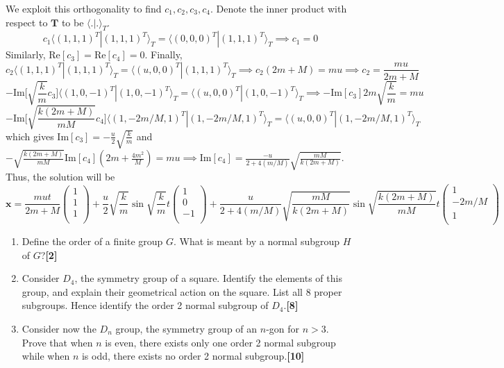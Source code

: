 \documentclass[a4paper]{article}
\begin{document}
\begin{ans}
\begin{enumerate}[label=(\roman*)]
We exploit this orthogonality to find $c_1,c_2,c_3,c_4$. Denote the inner product with respect to $\mathbf{T}$ to be $\langle.|.\rangle_T$.
$$c_1\langle (1,1,1)^T|(1,1,1)^T\rangle_T=\langle(0,0,0)^T|(1,1,1)^T\rangle_T\implies c_1=0$$
Similarly, $\text{Re}[c_3]=\text{Re}[c_4]=0$. Finally,
$$c_2\langle (1,1,1)^T|(1,1,1)^T\rangle_T=\langle(u,0,0)^T|(1,1,1)^T\rangle_T\implies c_2(2m+M)=mu\implies c_2=\frac{mu}{2m+M}$$
$$-\text{Im}\bigg[\sqrt{\frac{k}{m}}c_3\bigg]\langle (1,0,-1)^T|(1,0,-1)^T\rangle_T=\langle(u,0,0)^T|(1,0,-1)^T\rangle_T\implies -\text{Im}[c_3]2m\sqrt{\frac{k}{m}}=mu$$
$$-\text{Im}\bigg[\sqrt{\frac{k(2m+M)}{mM}}c_4\bigg]\langle (1,-2m/M,1)^T|(1,-2m/M,1)^T\rangle_T=\langle(u,0,0)^T|(1,-2m/M,1)^T\rangle_T$$
which gives $\text{Im}[c_3]=-\frac{u}{2}\sqrt{\frac{k}{m}}$ and $-\sqrt{\frac{k(2m+M)}{mM}}\text{Im}[c_4](2m+\frac{4m^2}{M})=mu\implies \text{Im}[c_4]=\frac{-u}{2+4(m/M)}\sqrt{\frac{mM}{k(2m+M)}}$. Thus, the solution will be
$$\mathbf{x}=\frac{mut}{2m+M}\begin{pmatrix}1\\1\\1\\\end{pmatrix}+\frac{u}{2}\sqrt{\frac{k}{m}}\sin\sqrt{\frac{k}{m}}t\begin{pmatrix}1\\0\\-1\\\end{pmatrix}+\frac{u}{2+4(m/M)}\sqrt{\frac{mM}{k(2m+M)}}\sin\sqrt{\frac{k(2m+M)}{mM}}t\begin{pmatrix}1\\-2m/M\\1\\\end{pmatrix}$$
\end{enumerate}
\end{ans}
\begin{qns}\leavevmode
\begin{enumerate}[label=(\roman*)]
\item Define the order of a finite group $G$. What is meant by a normal subgroup $H$ of $G$?\hfill\textbf{[2]}
\item Consider $D_4$, the symmetry group of a square. Identify the elements of this group, and explain their geometrical action on the square. List all 8 proper subgroups. Hence identify the order 2 normal subgroup of $D_4$.\hfill\textbf{[8]}
\item Consider now the $D_n$ group, the symmetry group of an $n$-gon for $n > 3$. Prove that when $n$ is even, there exists only one order 2 normal subgroup while when $n$ is odd, there  exists no order 2 normal subgroup.\hfill\textbf{[10]}
\end{enumerate}
\end{qns}
\end{document}

